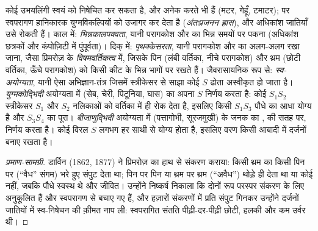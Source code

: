 \begin{proposition}[स्व-निषेचन से बचना]\label{prop:b2:angiosperm-reproduction:selfing}
कोई उभयलिंगी  स्वयं को निषेचित कर सकता है, और अनेक करते भी हैं
(मटर, गेहूँ, टमाटर); पर स्वपरागण  हानिकारक युग्मविकल्पियों को
उजागर कर देता है (\emph{अंतःप्रजनन ह्रास}), और अधिकांश जातियाँ उसे
रोकती हैं। काल में: \emph{भिन्नकालपक्वता}, यानी परागकोश और 
का भिन्न समयों पर पकना (अधिकांश छत्रकों और कंपोज़िटी में पुंपूर्वता)।
दिक् में: \emph{पृथक्केसरता}, यानी परागकोश और  का अलग-अलग
रखा जाना, जैसा प्रिमरोज़ के \emph{विषमवर्तिकत्व} में, जिसके पिन 
(लंबी वर्तिका, नीचे परागकोश) और थ्रम  (छोटी वर्तिका, ऊँचे
परागकोश)  को किसी कीट के भिन्न भागों पर रखते हैं। जैवरासायनिक रूप
से: \emph{स्व-अयोग्यता}, यानी ऐसा अभिज्ञान-तंत्र जिसमें
स्त्रीकेसर से साझा कोई $S$  ढोता  अस्वीकृत हो जाता है।
\emph{युग्मकोद्भिदी} अयोग्यता में (सेब, चेरी, पिटूनिया,
घास)  का अपना  $S$  निर्णय करता है: कोई
$S_1S_2$ स्त्रीकेसर $S_1$ और $S_2$ नलिकाओं को वर्तिका में ही रोक देता
है, इसलिए किसी $S_1S_3$ पौधे का  आधा योग्य है और $S_3S_4$ का पूरा।
\emph{बीजाणुद्भिदी} अयोग्यता में (पत्तागोभी, सूरजमुखी)
 के जनक का  ,  की
सतह पर, निर्णय करता है। कोई विरल $S$  लगभग हर साथी से योग्य
होता है, इसलिए वरण किसी आबादी में दर्जनों  बनाए रखता है।
\end{proposition}
\begin{proof}[प्रमाण-सामग्री]
डार्विन (1862, 1877) ने प्रिमरोज़ का हाथ से संकरण कराया: किसी थ्रम
 का  किसी पिन  पर (``वैध'' संगम) भरे हुए संपुट देता
था; पिन पर पिन या थ्रम पर थ्रम (``अवैध'') थोड़े ही  देता था या कोई
नहीं, जबकि पौधे स्वस्थ थे और  जीवित। उन्होंने
निष्कर्ष निकाला कि दोनों रूप परस्पर संकरण के लिए अनुकूलित हैं और
स्वपरागण से बचाए गए हैं, और हज़ारों संकरणों में प्रति संपुट 
गिनकर उन्होंने दर्जनों जातियों में स्व-निषेचन की क़ीमत नाप ली:
स्वपरागित संतति पीढ़ी-दर-पीढ़ी छोटी, हलकी और कम उर्वर थी।
\end{proof}

